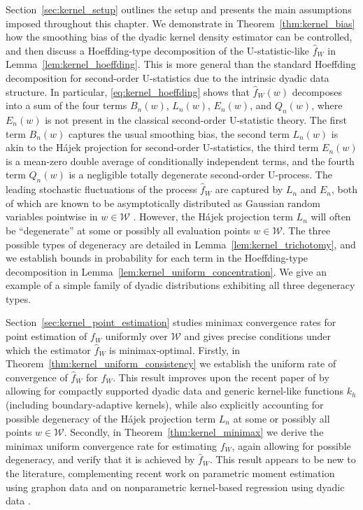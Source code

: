 \documentclass[11pt,lof]{puthesis}
\newcommand{\cW}{\ensuremath{\mathcal{W}}}
\theoremstyle{break}
\theoremstyle{proof}
\begin{document}
Section~\ref{sec:kernel_setup} outlines the setup and presents the main
assumptions imposed throughout this chapter. We demonstrate in
Theorem~\ref{thm:kernel_bias} how the smoothing bias of the dyadic kernel
density estimator can be controlled, and then discuss a Hoeffding-type
decomposition of the U-statistic-like $\hat{f}_W$
in Lemma~\ref{lem:kernel_hoeffding}. This is more general than
the standard Hoeffding decomposition for second-order U-statistics due to the
intrinsic dyadic data structure. In particular, \eqref{eq:kernel_hoeffding}
shows that $\hat{f}_W(w)$ decomposes into a sum of the four terms $B_n(w)$,
$L_n(w)$, $E_n(w)$, and $Q_n(w)$, where $E_n(w)$ is not present in the classical
second-order U-statistic theory. The first term $B_n(w)$ captures the usual
smoothing bias, the second term $L_n(w)$ is akin to the H{\'a}jek projection
for second-order U-statistics, the third term $E_n(w)$ is a mean-zero double
average of conditionally independent terms, and the fourth term $Q_n(w)$ is a
negligible totally degenerate second-order U-process. The leading stochastic
fluctuations of the process $\hat{f}_W$ are captured by $L_n$ and $E_n$, both
of which are known to be asymptotically distributed as Gaussian random
variables pointwise in $w\in\cW$ \citep{graham2024kernel}. However, the
H{\'a}jek projection term $L_n$ will often be ``degenerate'' at some or
possibly all evaluation points $w\in\cW$.
The three possible types of degeneracy are detailed in
Lemma~\ref{lem:kernel_trichotomy},
and we establish bounds in probability for each term in the Hoeffding-type
decomposition in Lemma~\ref{lem:kernel_uniform_concentration}.
We give an example of a simple family of dyadic distributions
exhibiting all three degeneracy types.

Section~\ref{sec:kernel_point_estimation} studies minimax convergence rates for
point
estimation of $f_W$ uniformly over $\cW$ and gives precise conditions under
which the estimator $\hat{f}_W$ is minimax-optimal. Firstly, in
Theorem~\ref{thm:kernel_uniform_consistency} we establish the uniform rate of
convergence of $\hat{f}_W$ for $f_W$. This result improves upon the recent
paper of \citet{chiang2020empirical} by allowing for compactly supported dyadic
data and generic kernel-like functions $k_h$ (including boundary-adaptive
kernels), while also explicitly accounting for possible degeneracy of the
H\'{a}jek projection term $L_n$ at some or possibly all points $w\in\cW$.
Secondly, in Theorem~\ref{thm:kernel_minimax} we derive the minimax uniform
convergence rate for estimating $f_W$, again allowing for possible degeneracy,
and verify that it is achieved by $\hat f_W$. This result appears to be new to
the literature, complementing recent work on parametric moment estimation using
graphon data \citep{gao2021minimax} and on nonparametric kernel-based
regression using dyadic data \citep{graham2021minimax}.
\end{document}
